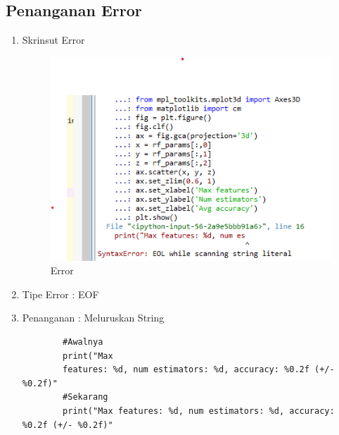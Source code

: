 \subsection{Penanganan Error}
\begin{enumerate}
    \item Skrinsut Error
    \begin{figure}[ht]
        \centering
        \includegraphics[scale=0.2]{figures/1174035/chapter4/error.png}
        \caption{Error}
        \label{contoh13}
    \end{figure}
    \item Tipe Error : EOF
    \item Penanganan : Meluruskan String
    \begin{verbatim}
        #Awalnya
        print("Max 
        features: %d, num estimators: %d, accuracy: %0.2f (+/- %0.2f)" 
        #Sekarang
        print("Max features: %d, num estimators: %d, accuracy: %0.2f (+/- %0.2f)" 
    \end{verbatim}
\end{enumerate}
